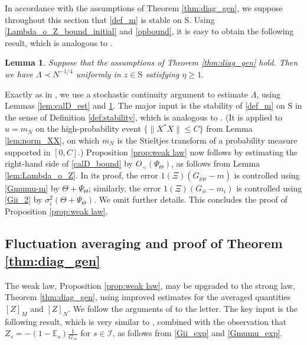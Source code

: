 \documentclass[11pt]{article} %
\numberwithin{equation}{section}
\numberwithin{figure}{section}
\theoremstyle{plain} %
\newtheorem{lemma}[theorem]{Lemma}
\theoremstyle{definition} %
\newcommand{\f}[1]{\boldsymbol{\mathrm{#1}}} %
\renewcommand{\cal}{\mathcal}
\newcommand{\E}{\mathbb{E}}
\renewcommand{\leq}{\leqslant}
\renewcommand{\geq}{\geqslant}
\newcommand{\ind}[1]{\f 1 (#1)}
\newcommand{\norm}[1]{\lVert #1 \rVert}
\begin{document}
In accordance with the assumptions of Theorem \ref{thm:diag_gen}, we suppose throughout this section that \eqref{def_m} is stable on $\f S$. Using \eqref{Lambda_o_Z_bound_initial} and \eqref{opbound}, it is easy to obtain the following result, which is analogous to \cite[Lemma 4.6]{BEKYY}.
\begin{lemma} \label{lem:initial}
Suppose that the assumptions of Theorem \ref{thm:diag_gen} hold.
Then we have $\Lambda \prec N^{-1/4}$ uniformly in $z \in \f S$ satisfying $\eta \geq 1$.
\end{lemma}

Exactly as in \cite[Section 4]{BEKYY}, we use a stochastic continuity argument to estimate $\Lambda$, using Lemmas \ref{lem:calD_est} and \ref{lem:initial}. The major input is the stability of \eqref{def_m} on $\f S$ in the sense of Definition \ref{def:stability}, which is analogous to \cite[Lemma 4.5]{BEKYY}. (It is applied to $u = m_N$ on the high-probability event $\{\norm{X^* X} \leq C\}$ from Lemma \ref{lem:norm_XX}, on which $m_N$ is the Stieltjes transform of a probability measure supported in $[0,C]$.) Proposition \ref{prop:weak law} now follows by estimating the right-hand side of \eqref{calD_bound} by $O_\prec(\Psi_\Theta)$, as follows from Lemma \ref{lem:Lambda_o_Z}. In its proof, the error $\ind{\Xi} (G_{\mu \mu} - m)$ is controlled using \eqref{Gmumu-m} by $\Theta + \Psi_\Theta$; similarly, the error $\ind{\Xi} (G_{ii} - m_i)$ is controlled using \eqref{Gii_2} by $\sigma_i^2 (\Theta + \Psi_\Theta)$. We omit further details. This concludes the proof of Proposition \ref{prop:weak law}.


\subsection{Fluctuation averaging and proof of Theorem \ref{thm:diag_gen}}

The weak law, Proposition \ref{prop:weak law}, may be upgraded to the strong law, Theorem \ref{thm:diag_gen}, using improved estimates for the averaged quantities $[Z]_M$ and $[Z]_N$. We follow the arguments of \cite[Section 4.2]{BEKYY} to the letter. The key input is the following result, which is very similar to \cite[Lemma 4.9]{BEKYY}, combined with the observation that $Z_s = -(1 - \E_s) \frac{1}{G_{ss}}$ for $s \in \cal I$, as follows from \eqref{Gii_exp} and \eqref{Gmumu_exp}.
\end{document}
